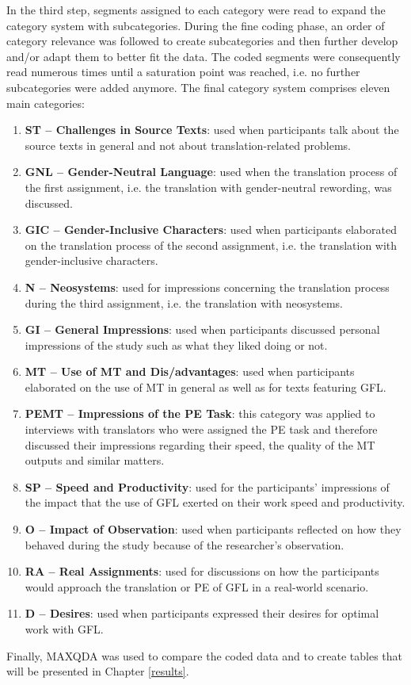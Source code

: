 In the third step, segments assigned to each category were read to expand the category system with subcategories. During the fine coding phase, an order of category relevance was followed to create subcategories and then further develop and/or adapt them to better fit the data. The coded segments were consequently read numerous times until a saturation point was reached, i.e. no further subcategories were added anymore. The final category system comprises eleven main categories: 
\begin{enumerate}
\setlength\itemsep{-0.5em}
    \item \textbf{ST -- Challenges in Source Texts}: used when participants talk about the source texts in general and not about translation-related problems.
    \item \textbf{GNL -- Gender-Neutral Language}: used when the translation process of the first assignment, i.e. the translation with gender-neutral rewording, was discussed.
    \item \textbf{GIC -- Gender-Inclusive Characters}: used when participants elaborated on the translation process of the second assignment, i.e. the translation with gender-inclusive characters.
    \item \textbf{N -- Neosystems}: used for impressions concerning the translation process during the third assignment, i.e. the translation with neosystems.
    \item \textbf{GI -- General Impressions}: used when participants discussed personal impressions of the study such as what they liked doing or not.
    \item \textbf{MT -- Use of MT and Dis/advantages}: used when participants elaborated on the use of MT in general as well as for texts featuring GFL.
    \item \textbf{PEMT -- Impressions of the PE Task}: this category was applied to interviews with translators who were assigned the PE task and therefore discussed their impressions regarding their speed, the quality of the MT outputs and similar matters.
    \item \textbf{SP -- Speed and Productivity}: used for the participants' impressions of the impact that the use of GFL exerted on their work speed and productivity.
    \item \textbf{O -- Impact of Observation}: used when participants reflected on how they behaved during the study because of the researcher's observation.
    \item \textbf{RA -- Real Assignments}: used for discussions on how the participants would approach the translation or PE of GFL in a real-world scenario.
    \item \textbf{D -- Desires}: used when participants expressed their desires for optimal work with GFL.
\end{enumerate}
Finally, MAXQDA was used to compare the coded data and to create tables that will be presented in Chapter \ref{results}. 

